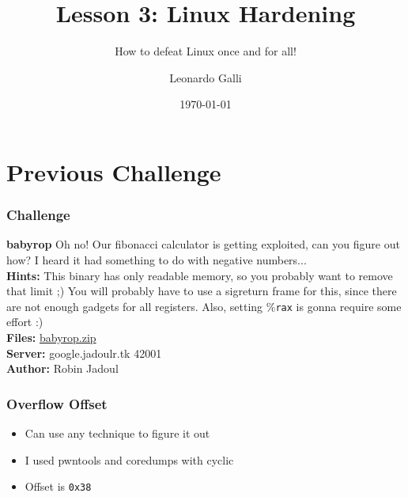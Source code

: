 \documentclass[aspectratio=169]{beamer}
\title{Lesson 3: Linux Hardening}
\subtitle{How to defeat Linux once and for all!}
\author{Leonardo Galli}
\date{\today}
\newcommand{\reg}[1]{\%\texttt{#1}}
\newcommand{\hex}[1]{\texttt{0x#1}}
\begin{document}
\titleframe

\tocframe

\section{Previous Challenge}
\begin{frame}
    \frametitle{Challenge}
    {
        \begin{alertblock}{\textbf{babyrop}}
            Oh no! Our fibonacci calculator is getting exploited, can you figure out how?
            I heard it had something to do with negative numbers...\\
            \textbf{Hints:} This binary has only readable memory, so you probably want to remove that limit ;)
            You will probably have to use a sigreturn frame for this, since there are not enough gadgets for all registers.
            Also, setting \reg{rax} is gonna require some effort :)\\
            \textbf{Files:} \href{https://flagbot.ch/babyrop.zip}{babyrop.zip}\\
            \textbf{Server:} google.jadoulr.tk 42001\\
            \textbf{Author:} Robin Jadoul
        \end{alertblock}
    }
\end{frame}

\begin{frame}[fragile]
    \frametitle{Overflow Offset}
    \pause
    \begin{itemize}
        \item Can use any technique to figure it out
        \item I used pwntools and coredumps with cyclic
        \item Offset is \hex{38}
    \end{itemize}
\end{frame}
\end{document}
